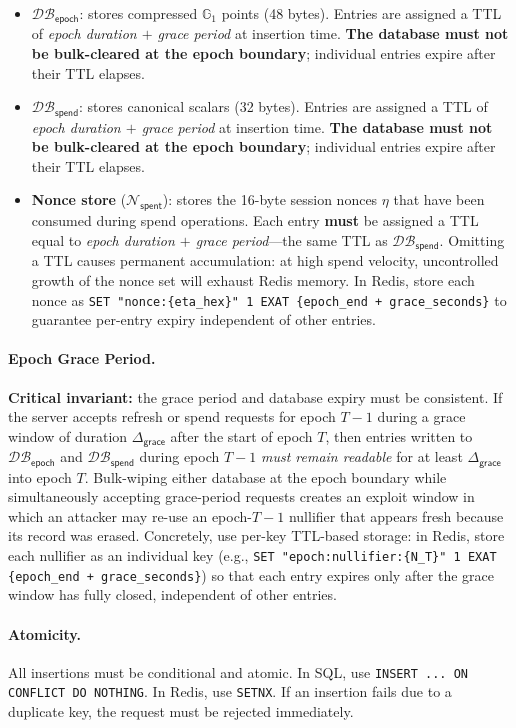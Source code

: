 \documentclass[11pt]{article}
\theoremstyle{definitionstyle}
\theoremstyle{plain}
\newcommand{\DB}{\mathcal{DB}}
\begin{document}
\begin{itemize}
\item $\DB_{\mathsf{epoch}}$: stores compressed $\mathbb{G}_1$ points (48 bytes). Entries are assigned a TTL of \emph{epoch duration $+$ grace period} at insertion time. \textbf{The database must not be bulk-cleared at the epoch boundary}; individual entries expire after their TTL elapses.
\item $\DB_{\mathsf{spend}}$: stores canonical scalars (32 bytes). Entries are assigned a TTL of \emph{epoch duration $+$ grace period} at insertion time. \textbf{The database must not be bulk-cleared at the epoch boundary}; individual entries expire after their TTL elapses.
\item \textbf{Nonce store} ($\mathcal{N}_{\mathsf{spent}}$): stores the 16-byte session nonces $\eta$ that have been consumed during spend operations. Each entry \textbf{must} be assigned a TTL equal to \emph{epoch duration $+$ grace period}---the same TTL as $\DB_{\mathsf{spend}}$. Omitting a TTL causes permanent accumulation: at high spend velocity, uncontrolled growth of the nonce set will exhaust Redis memory. In Redis, store each nonce as \texttt{SET "nonce:\{eta\_hex\}" 1 EXAT \{epoch\_end + grace\_seconds\}} to guarantee per-entry expiry independent of other entries.
\end{itemize}

\paragraph{Epoch Grace Period.}
\textbf{Critical invariant:} the grace period and database expiry must be consistent. If the server accepts refresh or spend requests for epoch $T-1$ during a grace window of duration $\Delta_{\mathsf{grace}}$ after the start of epoch $T$, then entries written to $\DB_{\mathsf{epoch}}$ and $\DB_{\mathsf{spend}}$ during epoch $T-1$ \emph{must remain readable} for at least $\Delta_{\mathsf{grace}}$ into epoch $T$. Bulk-wiping either database at the epoch boundary while simultaneously accepting grace-period requests creates an exploit window in which an attacker may re-use an epoch-$T{-}1$ nullifier that appears fresh because its record was erased. Concretely, use per-key TTL-based storage: in Redis, store each nullifier as an individual key (e.g., \texttt{SET "epoch:nullifier:\{N\_T\}" 1 EXAT \{epoch\_end + grace\_seconds\}}) so that each entry expires only after the grace window has fully closed, independent of other entries.

\paragraph{Atomicity.}
All insertions must be conditional and atomic. In SQL, use \texttt{INSERT ... ON CONFLICT DO NOTHING}. In Redis, use \texttt{SETNX}. If an insertion fails due to a duplicate key, the request must be rejected immediately.
\end{document}
